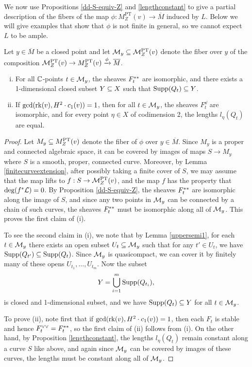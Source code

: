 We now use Propositions \ref{dd-S-equiv-Z} and \ref{lengthconstant} to give a partial description of the fibers of the map $\phi: M^{\text{PT}}_Z(v) \to \overline{M}$ induced by $L$. Below we will give examples that show that $\phi$ is not finite in general, so we cannot expect $L$ to be ample.
\begin{thm}\label{fiberdescription}
Let $y \in \overline{M}$ be a closed point and let $\mathcal{M}_y \subseteq \mathcal{M}^{\mathrm{PT}}_Z(v)$ denote the fiber over $y$ of the composition $\mathcal{M}^{\mathrm{PT}}_Z(v) \to M^{\mathrm{PT}}_Z(v) \xrightarrow{\phi} \overline{M}$. 
\begin{enumerate}[(i)]
    \item For all $\mathbb{C}$-points $t \in \mathcal{M}_y$, the sheaves $F_t^{\ast\ast}$ are isomorphic, and there exists a 1-dimensional closed subset $Y \subseteq X$ such that $\operatorname{\mathrm{Supp}}(Q_t) \subseteq Y$.
    \item If $\gcd(\operatorname{\mathrm{rk}}(v), H^2 \cdot c_1(v)) = 1$, then for all $t \in \mathcal{M}_y$, the sheaves $F_t^\dd$ are isomorphic, and for every point $\eta \in X$ of codimension 2, the lengths $l_\eta(Q_t)$ are equal.
\end{enumerate}
\end{thm}
\begin{proof}
Let $M_y \subseteq M^{\mathrm{PT}}_Z(v)$ denote the fiber of $\phi$ over $y \in \overline{M}$. Since $M_y$ is a proper and connected algebraic space, it can be covered by images of maps $S \to M_y$ where $S$ is a smooth, proper, connected curve. Moreover, by Lemma \ref{finitecurveextension}, after possibly taking a finite cover of $S$, we may assume that the map lifts to $f: S \to \mathcal{M}^{\text{PT}}_Z(v)$, and the map $f$ has the property that $\deg(f^*\mathcal{L}) = 0$. By Proposition \ref{dd-S-equiv-Z}, the sheaves $F_t^{\ast\ast}$ are isomorphic along the image of $S$, and since any two points in $\mathcal{M}_y$ can be connected by a chain of such curves, the sheaves $F_t^{\ast\ast}$ must be isomorphic along all of $\mathcal{M}_y$. This proves the first claim of (i).

To see the second claim in (i), we note that by Lemma \ref{uppersemi1}, for each $t \in \mathcal{M}_y$ there exists an open subset $U_t \subseteq \mathcal{M}_y$ such that for any $t' \in U_t$, we have $\operatorname{\mathrm{Supp}}(Q_{t'}) \subseteq \operatorname{\mathrm{Supp}}(Q_t)$. Since $\mathcal{M}_y$ is quasicompact, we can cover it by finitely many of these opens $U_{t_1}, \ldots, U_{t_m}$. Now the subset 
\[ Y = \bigcup_{i=1}^m \operatorname{\mathrm{Supp}}(Q_{t_i}), \]
is closed and 1-dimensional subset, and we have $\operatorname{\mathrm{Supp}}(Q_t) \subseteq Y$ for all $t \in \mathcal{M}_y$.

To prove (ii), note first that if $\gcd(\operatorname{\mathrm{rk}}(v), H^2 \cdot c_1(v)) = 1$, then each $F_t$ is stable and hence $F_t^{\vee\vee} = F_t^{\ast\ast}$, so the first claim of (ii) follows from (i). On the other hand, by Proposition \ref{lengthconstant}, the lengths $l_\eta(Q_t)$ remain constant along a curve $S$ like above, and again since $\mathcal{M}_y$ can be covered by images of these curves, the lengths must be constant along all of $\mathcal{M}_y$.
\end{proof}

